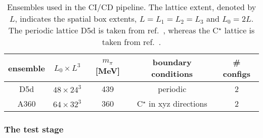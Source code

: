 \begin{table}[t]
\centering
\begin{tabular}{ccccc}
  \toprule
  {ensemble} &
  {$L_0 \times L^3$} &
  {$m_{\pi}$ [MeV]} &
  {boundary conditions} &
  {\# configs} \\
  \midrule
  D5d  & $48 \times 24^3$ & 439 & periodic    & 2 \\
  A360 & $64 \times 32^3$ & 360 & C$^{\star}$ in xyz directions & 2 \\
  \bottomrule
\end{tabular}
\caption{\label{tab:cicd:ensembles}%
Ensembles used in the CI/CD pipeline.
The lattice extent, denoted by $L$, indicates the spatial box extents, $L = L_1 = L_2 = L_3$ and $L_0 = 2L$.
The periodic lattice D5d is taken from ref.~\cite{online:cls}, whereas the C$^{\star}$ lattice is taken from ref.~\cite{RCstar22}.}
\end{table}

\subsubsection{The test stage}
\label{sec:cicd:pipeline:gitlab:test}


